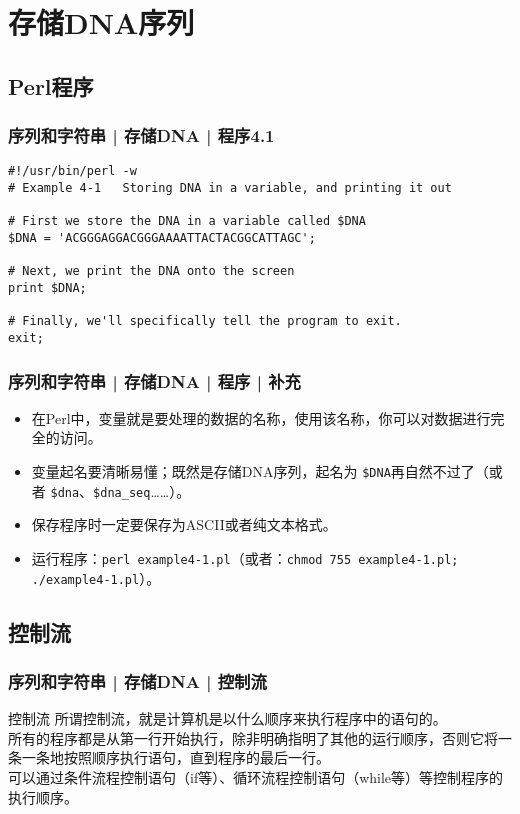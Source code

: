 \section{存储DNA序列}
\subsection{Perl程序}
\begin{frame}[fragile,label=exam4.1]
  \frametitle{序列和字符串 | 存储DNA | \alert{程序4.1}}
  \vspace{-1.5em}
\begin{lstlisting}
#!/usr/bin/perl -w
# Example 4-1   Storing DNA in a variable, and printing it out

# First we store the DNA in a variable called $DNA
$DNA = 'ACGGGAGGACGGGAAAATTACTACGGCATTAGC';

# Next, we print the DNA onto the screen
print $DNA;

# Finally, we'll specifically tell the program to exit.
exit;
\end{lstlisting}
\end{frame}

\begin{frame}[fragile]
  \frametitle{序列和字符串 | 存储DNA | 程序 | \alert{补充}}
  \begin{itemize}
    \item 在Perl中，变量就是要处理的数据的名称，使用该名称，你可以对数据进行完全的访问。
    \item 变量起名要清晰易懂；既然是存储DNA序列，起名为 \verb|$DNA|再自然不过了（或者 \verb|$dna|、\verb|$dna_seq|……）。
    \item 保存程序时一定要保存为ASCII或者纯文本格式。
    \item 运行程序：\verb|perl example4-1.pl|（或者：\verb|chmod 755 example4-1.pl; ./example4-1.pl|）。
  \end{itemize}
\end{frame}

\subsection{控制流}
\begin{frame}
  \frametitle{序列和字符串 | 存储DNA | 控制流}
  \begin{block}{控制流}
  所谓控制流，就是计算机是以什么顺序来执行程序中的语句的。\\
  \vspace{1em}
  所有的程序都是从第一行开始执行，除非明确指明了其他的运行顺序，否则它将一条一条地按照顺序执行语句，直到程序的最后一行。\\
  \vspace{1em}
  可以通过条件流程控制语句（if等）、循环流程控制语句（while等）等控制程序的执行顺序。
  \end{block}
\end{frame}

